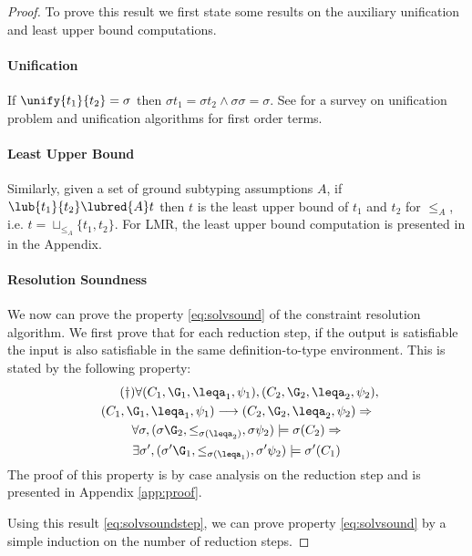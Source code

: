 \begin{proof}
To prove this result we first state some results on the auxiliary unification and least upper bound computations.

\paragraph{Unification} %
If $\unify{t_1}{t_2} = \sigma$ then $ \sigma t_1 = \sigma t_2 \wedge \sigma\sigma = \sigma $.
See \cite{0092409} for a survey on unification problem and unification algorithms for first order terms.

\paragraph{Least Upper Bound} 
Similarly, given a set of ground subtyping assumptions $A$, 
if $\lub{t_1}{t_2} \lubred{A} t$ then $t$ is the least upper bound of $t_1$ and
$t_2$ for $\leq_A$, i.e. $t = \sqcup_{\leq_A}\{t_1,t_2\}$. 
For LMR, the least upper bound computation is presented in   in the Appendix.



\paragraph{Resolution Soundness} We now can prove the property \ref{eq:solvsound} of the constraint resolution algorithm. We
first prove that for each reduction step, if the output is satisfiable the input is also satisfiable in the 
same definition-to-type environment. This is stated by the following property:\vspace*{-2mm}
\begin{multline}\tag{$\dagger$}\label{eq:solvsoundstep}
 \forall (C_1,\G_1,\leqa_1,\psi_1), (C_2,\G_2,\leqa_2,\psi_2),\\
     (C_1,\G_1,\leqa_1,\psi_1) \longrightarrow (C_2,\G_2,\leqa_2,\psi_2) \Rightarrow\\
     \forall \sigma, (\sigma\G_2,\leq_{\sigma(\leqa_2)},\sigma\psi_2) \models \sigma(C_2) \Rightarrow\\
     \exists \sigma', (\sigma'\G_1,\leq_{\sigma(\leqa_1)},\sigma'\psi_2) \models \sigma'(C_1)\vspace*{-2mm}
\end{multline}  
  

The proof of this property is by case analysis on the reduction step and is presented in Appendix \ref{app:proof}. 

Using this result \ref{eq:solvsoundstep}, we can prove property \ref{eq:solvsound} by a simple
induction on the number of reduction steps.\vspace*{-3mm}
  
\end{proof}
